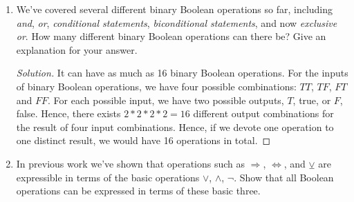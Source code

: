 \documentclass[12pt]{article}
\renewcommand\qedsymbol{$\blacksquare$}
\newenvironment{solution}
{\begin{proof}[Solution]\renewcommand\qedsymbol{$\square$}}
	{\end{proof}}
\begin{document}
\begin{enumerate}
\begin{enumerate}
		\begin{proof}
			\begin{displaymath}
			\begin{array}{c| c| c|c|c|c|c}
				x & y & x \lor y& x \land y& \lnot (x \land y) &(x \lor y) \land \lnot (x\land y)&x \veebar y\\ 
				\hline  
				T & T & T &T&F&F&F\\
				T & F & T &F&T&T&T\\
				F & T & T &F&T&T&T\\
				F & F & F &F&T&F&F\\
			\end{array}	
		\end{displaymath}
		Since the truth values are identical in the last two columns, we can conclude that $x \veebar y$ is logically equivalent to $(x \lor y) \land \lnot (x\land y)$.  
		\end{proof}
		\item Explain why the operation $\veebar$ is called \emph{exclusive or}. 
		\begin{solution}
			A possible explanation of naming the operation $\veebar$ \emph{exclusive or} is that it only outputs true when either of the input is true but not both. Operation $\lor$ outputs true when either of the input is true including the case where both are true. Thus, the exclusivity of the case where both inputs are true gives it its name.
		\end{solution}
	\end{enumerate}
	
	\item
	We've covered several different binary Boolean operations so far, including \emph{and}, \emph{or}, \emph{conditional statements}, \emph{biconditional statements}, and now \emph{exclusive or}. How many different binary Boolean operations can there be? Give an explanation for your answer.\\
	\begin{solution}
		It can have as much as 16 binary Boolean operations. For the inputs of binary Boolean operations, we have four possible combinations: $TT$,  $TF$, $FT$ and $FF$. For each possible input, we have two possible outputs, $T$, true, or $F$, false. Hence, there exists $2*2*2*2=16$ different output combinations for the result of four input combinations. Hence, if we devote one operation to one distinct result, we would have 16 operations in total.
	\end{solution}
	\item
	In previous work we've shown that operations such as $\Longrightarrow$, $\iff$, and $\veebar$ are expressible in terms of the basic operations $\lor$, $\land$, $\lnot$. Show that all Boolean operations can be expressed in terms of these basic three. \\
	

\end{enumerate}
\end{document}
